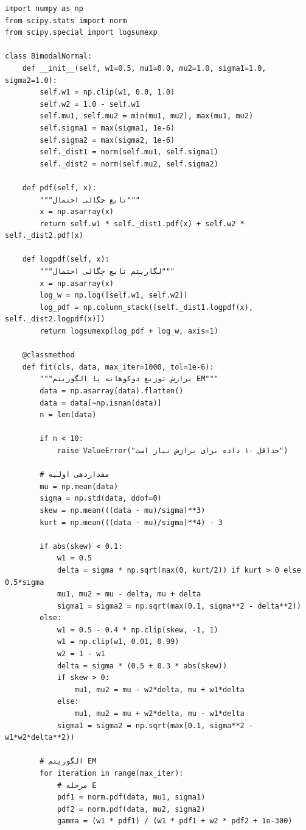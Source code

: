 \documentclass[a4paper,12pt]{article}
\begin{document}
\begin{verbatim}
import numpy as np
from scipy.stats import norm
from scipy.special import logsumexp

class BimodalNormal:
    def __init__(self, w1=0.5, mu1=0.0, mu2=1.0, sigma1=1.0, sigma2=1.0):
        self.w1 = np.clip(w1, 0.0, 1.0)
        self.w2 = 1.0 - self.w1
        self.mu1, self.mu2 = min(mu1, mu2), max(mu1, mu2)
        self.sigma1 = max(sigma1, 1e-6)
        self.sigma2 = max(sigma2, 1e-6)
        self._dist1 = norm(self.mu1, self.sigma1)
        self._dist2 = norm(self.mu2, self.sigma2)
    
    def pdf(self, x):
        """تابع چگالی احتمال"""
        x = np.asarray(x)
        return self.w1 * self._dist1.pdf(x) + self.w2 * self._dist2.pdf(x)
    
    def logpdf(self, x):
        """لگاریتم تابع چگالی احتمال"""
        x = np.asarray(x)
        log_w = np.log([self.w1, self.w2])
        log_pdf = np.column_stack([self._dist1.logpdf(x), self._dist2.logpdf(x)])
        return logsumexp(log_pdf + log_w, axis=1)
    
    @classmethod
    def fit(cls, data, max_iter=1000, tol=1e-6):
        """برازش توزیع دوکوهانه با الگوریتم EM"""
        data = np.asarray(data).flatten()
        data = data[~np.isnan(data)]
        n = len(data)
        
        if n < 10:
            raise ValueError("حداقل ۱۰ داده برای برازش نیاز است")
        
        # مقداردهی اولیه
        mu = np.mean(data)
        sigma = np.std(data, ddof=0)
        skew = np.mean(((data - mu)/sigma)**3)
        kurt = np.mean(((data - mu)/sigma)**4) - 3
        
        if abs(skew) < 0.1:
            w1 = 0.5
            delta = sigma * np.sqrt(max(0, kurt/2)) if kurt > 0 else 0.5*sigma
            mu1, mu2 = mu - delta, mu + delta
            sigma1 = sigma2 = np.sqrt(max(0.1, sigma**2 - delta**2))
        else:
            w1 = 0.5 - 0.4 * np.clip(skew, -1, 1)
            w1 = np.clip(w1, 0.01, 0.99)
            w2 = 1 - w1
            delta = sigma * (0.5 + 0.3 * abs(skew))
            if skew > 0:
                mu1, mu2 = mu - w2*delta, mu + w1*delta
            else:
                mu1, mu2 = mu + w2*delta, mu - w1*delta
            sigma1 = sigma2 = np.sqrt(max(0.1, sigma**2 - w1*w2*delta**2))
        
        # الگوریتم EM
        for iteration in range(max_iter):
            # مرحله E
            pdf1 = norm.pdf(data, mu1, sigma1)
            pdf2 = norm.pdf(data, mu2, sigma2)
            gamma = (w1 * pdf1) / (w1 * pdf1 + w2 * pdf2 + 1e-300)
            

\end{verbatim}
\end{document}
